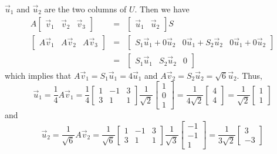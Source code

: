 \documentclass{ximera}
\begin{document}
\begin{example}
\begin{explanation}
$\vec{u}_1$ and $\vec{u}_2$ are the two columns of $U$. Then we have
\begin{eqnarray*}
A\left[\begin{array}{ccc} \vec{v}_1 & \vec{v}_2 & \vec{v}_3 \end{array}\right]
&=& \left[\begin{array}{cc} \vec{u}_1 & \vec{u}_2 \end{array}\right]S\\
\left[\begin{array}{ccc} A\vec{v}_1 & A\vec{v}_2 & A\vec{v}_3 \end{array}\right]
&=& \left[\begin{array}{ccc} S_1\vec{u}_1 + 0\vec{u}_2 &
0\vec{u}_1 + S_2 \vec{u}_2 & 0 \vec{u}_1 + 0\vec{u}_2 \end{array}\right] \\
&=& \left[\begin{array}{ccc} S_1\vec{u}_1 & S_2 \vec{u}_2 &
0 \end{array}\right]
\end{eqnarray*}
which implies that $A\vec{v}_1=S_1\vec{u}_1 = 4\vec{u}_1$ and
$A\vec{v}_2=S_2\vec{u}_2 = \sqrt 6 \vec{u}_2$. Thus,
\[ \vec{u}_1 = \frac{1}{4}A\vec{v}_1
= \frac{1}{4}
\left[\begin{array}{rrr} 1 & -1 & 3 \\ 3 & 1 & 1 \end{array}\right]
\frac{1}{\sqrt{2}}\left[\begin{array}{r} 1\\ 0\\ 1 \end{array}\right]
= \frac{1}{4\sqrt 2}\left[\begin{array}{r} 4\\ 4 \end{array}\right]
= \frac{1}{\sqrt 2}\left[\begin{array}{r} 1\\ 1 \end{array}\right]\]
and
\[ \vec{u}_2 = \frac{1}{\sqrt 6}A\vec{v}_2
= \frac{1}{\sqrt 6}
\left[\begin{array}{rrr} 1 & -1 & 3 \\ 3 & 1 & 1 \end{array}\right]
\frac{1}{\sqrt{3}}\left[\begin{array}{r} -1\\ -1\\ 1 \end{array}\right]
=\frac{1}{3\sqrt 2}\left[\begin{array}{r} 3\\ -3 \end{array}\right]
\]
\end{explanation}
\end{example}
\end{document}
